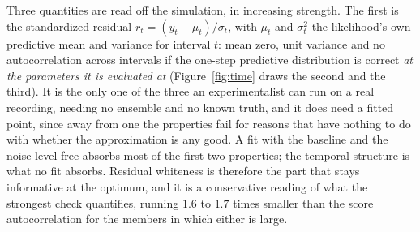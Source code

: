 Three quantities are read off the simulation, in increasing strength. The first is the standardized residual $r_t=(y_t-\mu_t)/\sigma_t$, with $\mu_t$ and $\sigma_t^2$ the likelihood's own predictive mean and variance for interval $t$: mean zero, unit variance and no autocorrelation across intervals if the one-step predictive distribution is correct \emph{at the parameters it is evaluated at} (Figure~\ref{fig:time} draws the second and the third). It is the only one of the three an experimentalist can run on a real recording, needing no ensemble and no known truth, and it does need a fitted point, since away from one the properties fail for reasons that have nothing to do with whether the approximation is any good. A fit with the baseline and the noise level free absorbs most of the first two properties; the temporal structure is what no fit absorbs. Residual whiteness is therefore the part that stays informative at the optimum, and it is a conservative reading of what the strongest check quantifies, running $1.6$ to $1.7$ times smaller than the score autocorrelation for the members in which either is large. %
